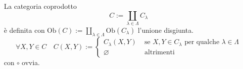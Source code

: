 \begin{example}
    La categoria coprodotto
    \[
      C := \coprod_{\lambda \in \Lambda} C_{\lambda} 
    \]
    è definita con \(\mathrm{Ob}{(C)} := \coprod_{\lambda \in \Lambda} \mathrm{Ob}{(C_{\lambda} )}\) l'unione disgiunta. 
    \[
      \forall X, Y \in C \quad C{(X, Y)} := \begin{cases}{}
          C_{\lambda} {(X, Y)} & \text{ se } X, Y \in C_{\lambda} \text{ per
          qualche } \lambda \in \Lambda \\
              \varnothing & \text{ altrimenti}
      \end{cases}
    \]
    con \(\circ\) ovvia.
\end{example}




